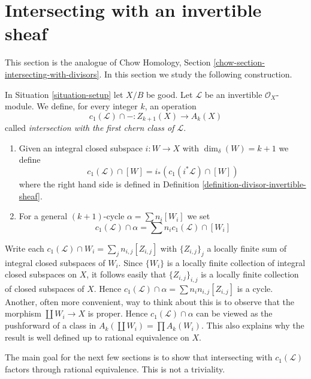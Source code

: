 








\section{Intersecting with an invertible sheaf}
\label{section-intersecting-with-divisors}

\noindent
This section is the analogue of
Chow Homology, Section \ref{chow-section-intersecting-with-divisors}.
In this section we study the following construction.

\begin{definition}
\label{definition-cap-c1}
In Situation \ref{situation-setup} let $X/B$ be good.
Let $\mathcal{L}$ be an invertible $\mathcal{O}_X$-module.
We define, for every integer $k$, an operation
$$
c_1(\mathcal{L}) \cap - :
Z_{k + 1}(X) \to A_k(X)
$$
called {\it intersection with the first chern class of $\mathcal{L}$}.
\begin{enumerate}
\item Given an integral closed subspace $i : W \to X$ with
$\dim_\delta(W) = k + 1$ we define
$$
c_1(\mathcal{L}) \cap [W] = i_*(c_1({i^*\mathcal{L}}) \cap [W])
$$
where the right hand side is defined in
Definition \ref{definition-divisor-invertible-sheaf}.
\item For a general $(k + 1)$-cycle $\alpha = \sum n_i [W_i]$ we set
$$
c_1(\mathcal{L}) \cap \alpha = \sum n_i c_1(\mathcal{L}) \cap [W_i]
$$
\end{enumerate}
\end{definition}

\noindent
Write each $c_1(\mathcal{L}) \cap W_i = \sum_j n_{i, j} [Z_{i, j}]$
with $\{Z_{i, j}\}_j$ a locally finite sum
of integral closed subspaces of $W_i$. Since $\{W_i\}$ is a locally
finite collection of integral closed subspaces on $X$, it follows
easily that $\{Z_{i, j}\}_{i, j}$ is a locally finite collection
of closed subspaces of $X$. Hence
$c_1(\mathcal{L}) \cap \alpha = \sum n_in_{i, j}[Z_{i, j}]$
is a cycle. Another, often more convenient, way to think about this
is to observe that the morphism $\coprod W_i \to X$ is
proper. Hence $c_1(\mathcal{L}) \cap \alpha$ can be viewed
as the pushforward of a class in $A_k(\coprod W_i) = \prod A_k(W_i)$.
This also explains why the result is well defined up to rational
equivalence on $X$.

\medskip\noindent
The main goal for the next few sections is to show that intersecting with
$c_1(\mathcal{L})$ factors through rational equivalence.
This is not a triviality.

